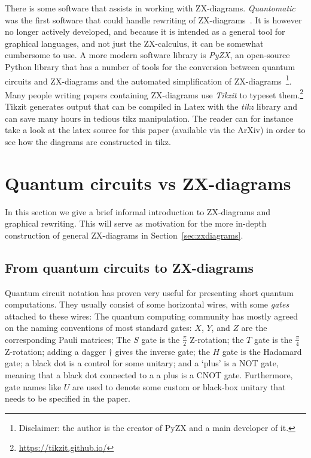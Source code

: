 \documentclass[a4paper,onecolumn,superscriptaddress,11pt,%
				unpublished,%
				allowfontchageintitle,%
				]{quantumarticle}
\begin{document}
There is some software that assists in working with ZX-diagrams. 
\emph{Quantomatic} was the first software that could handle rewriting of ZX-diagrams~\cite{kissinger2015quantomatic}. It is however no longer actively developed, and because it is intended as a general tool for graphical languages, and not just the ZX-calculus, it can be somewhat cumbersome to use. 
A more modern software library is \emph{PyZX}, an open-source Python library that has a number of tools for the conversion between quantum circuits and ZX-diagrams and the automated simplification of ZX-diagrams~\cite{pyzx}\footnote{Disclaimer: the author is the creator of PyZX and a main developer of it.}.
Many people writing papers containing ZX-diagrams use \emph{Tikzit} to typeset them.\footnote{\url{https://tikzit.github.io/}} 
Tikzit generates output that can be compiled in Latex with the \emph{tikz} library and can save many hours in tedious tikz manipulation.
The reader can for instance take a look at the latex source for this paper (available via the ArXiv) in order to see how the diagrams are constructed in tikz.

\section{Quantum circuits vs ZX-diagrams}\label{sec:circuits-vs-diagrams}

In this section we give a brief informal introduction to ZX-diagrams and graphical rewriting. This will serve as motivation for the more in-depth construction of general ZX-diagrams in Section~\ref{sec:zxdiagrams}.

\subsection{From quantum circuits to ZX-diagrams}

Quantum circuit notation has proven very useful for presenting short quantum computations. They usually consist of some horizontal wires, with some \emph{gates} attached to these wires:
The quantum computing community has mostly agreed on the naming conventions of most standard gates: $X$, $Y$, and $Z$ are the corresponding Pauli matrices; The $S$ gate is the $\frac\pi2$ Z-rotation; the $T$ gate is the $\frac\pi4$ Z-rotation; adding a dagger $\dagger$ gives the inverse gate; the $H$ gate is the Hadamard gate; a black dot is a control for some unitary; and a `plus' is a NOT gate, meaning that a black dot connected to a a plus is a CNOT gate. Furthermore, gate names like $U$ are used to denote some custom or black-box unitary that needs to be specified in the paper.
\end{document}
